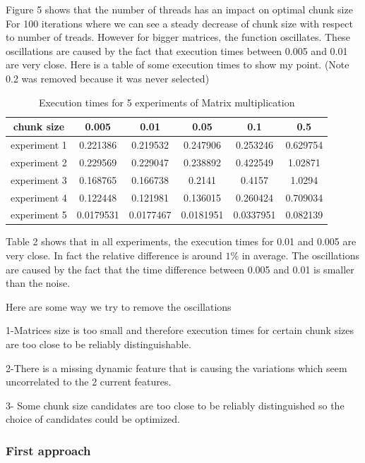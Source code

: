 Figure 5 shows that the number of threads has an impact on optimal chunk size For 100 iterations where we can see a steady decrease of chunk size with respect to number of treads. However for bigger matrices, the function oscillates. These oscillations are caused by the fact that execution times between 0.005 and 0.01 are very close. Here is a table of some execution times to show my point. (Note 0.2 was removed because it was never selected)

\begin{table}[h]
	\centering
	\caption{Execution times for 5 experiments of Matrix multiplication}
	\label{my-label}
	\begin{tabular}{|c|c|c|c|c|c|}
		\hline
		chunk size&0.005& 0.01           & 0.05 & 0.1 & 0.5 \\ \hline
		experiment 1&0.221386 & 0.219532  & 0.247906    & 0.253246        & 0.629754 \\ \hline
		experiment 2&0.229569 & 0.229047 & 0.238892   & 0.422549        & 1.02871  \\ \hline
		experiment 3&0.168765 & 0.166738  & 0.2141   & 0.4157       & 1.0294  \\ \hline
		experiment 4&0.122448 & 0.121981  & 0.136015    & 0.260424        & 0.709034 \\ \hline
		experiment 5 &0.0179531 & 0.0177467 & 0.0181951  & 0.0337951        & 0.082139 \\ \hline
	\end{tabular}
\end{table}

Table 2 shows that in all experiments, the execution times for 0.01 and 0.005 are very close. In fact the relative difference is around $1\%$ in average. The oscillations are caused by the fact that the time difference between 0.005 and 0.01 is smaller than the noise.

Here are some way we try to remove the oscillations

1-Matrices size is too small and therefore execution times for certain chunk sizes are too close to be reliably distinguishable.

2-There is a missing dynamic feature that is causing the variations which seem uncorrelated to the 2 current features.

3- Some chunk size candidates are too close to be reliably distinguished so the choice of candidates could be optimized.
\
\subsubsection{First approach}

